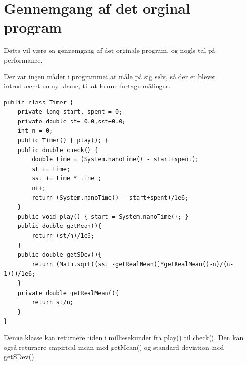 \section*{Gennemgang af det orginal program}
Dette vil være en gennemgang af det orginale program, og nogle tal på performance.

Der var ingen måder i programmet at måle på sig selv, så der er blevet introduceret en ny klasse, til at kunne fortage målinger.





\begin{lstlisting}
public class Timer {
    private long start, spent = 0;
    private double st= 0.0,sst=0.0;
    int n = 0;
    public Timer() { play(); }
    public double check() {
        double time = (System.nanoTime() - start+spent);
        st += time;
        sst += time * time ;
        n++;
        return (System.nanoTime() - start+spent)/1e6;
    }
    public void play() { start = System.nanoTime(); }
    public double getMean(){
        return (st/n)/1e6;
    }
    public double getSDev(){
        return (Math.sqrt((sst -getRealMean()*getRealMean()-n)/(n-1)))/1e6;
    }
    private double getRealMean(){
        return st/n;
    }
}
\end{lstlisting}

Denne klasse kan returnere tiden i milliesekunder fra play() til check().
Den kan også returnere empirical mean med getMean() og standard deviation med getSDev().

